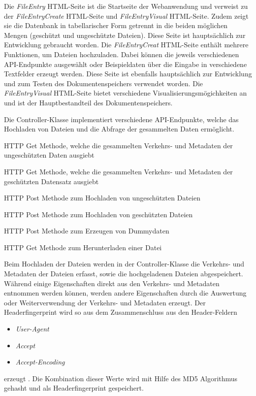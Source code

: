 \documentclass[
    fontsize=12pt,
    headings=small,
    parskip=half,           %
    bibliography=totoc,
    numbers=noenddot,       %
    open=any,               %
    ]{scrreprt}
\begin{document}
Die \textit{FileEntry} HTML-Seite ist die Startseite der Webanwendung und verweist zu der \textit{FileEntryCreate} HTML-Seite und \textit{FileEntryVisual} HTML-Seite.
Zudem zeigt sie die Datenbank in tabellarischer Form getrennt in die beiden möglichen Mengen (geschützt und ungeschützte Dateien).
Diese Seite ist hauptsächlich zur Entwicklung gebraucht worden.
Die \textit{FileEntryCreat} HTML-Seite enthält mehrere Funktionen, um Dateien hochzuladen.
Dabei können die jeweils verschiedenen API-Endpunkte ausgewählt oder Beispieldaten über die Eingabe in verschiedene Textfelder erzeugt werden. 
Diese Seite ist ebenfalls hauptsächlich zur Entwicklung und zum Testen des Dokumentenspeichers verwendet worden.
Die \textit{FileEntryVisual} HTML-Seite bietet verschiedene Visualisierungsmögichkeiten an und ist der Hauptbestandteil des Dokumentenspeichers.

Die Controller-Klasse implementiert verschiedene API-Endpunkte, welche das Hochladen von Dateien und die Abfrage der gesammelten Daten ermöglicht.
\begin{description}[style=nextline]   
\item[/api/GetA] HTTP Get Methode, welche die gesammelten Verkehrs- und Metadaten der ungeschützten Daten ausgiebt
\item[/api/GetB] HTTP Get Methode, welche die gesammelten Verkehrs- und Metadaten der geschützten Datensatz ausgiebt
\item[/api/uploadA] HTTP Post Methode zum Hochladen von ungeschützten Dateien
\item[/api/uploadB] HTTP Post Methode zum Hochladen von geschützten Dateien
\item[api/uploadEmu] HTTP Post Methode zum Erzeugen von Dummydaten
\item[api/getFile] HTTP Get Methode zum Herunterladen einer Datei
\end{description}

Beim Hochladen der Dateien werden in der Controller-Klasse die Verkehrs- und Metadaten der Dateien erfasst, sowie die hochgeladenen Dateien abgespeichert.
Während einige Eigenschaften direkt aus den Verkehrs- und Metadaten entnommen werden können, werden andere Eigenschaften durch die Auswertung oder Weiterverwendung der Verkehrs- und Metadaten erzeugt.
Der Headerfingerprint wird so aus dem Zusammenschluss aus den Header-Feldern
\begin{itemize}
\item \textit{User-Agent} \cite[sec. 5.5.3]{RFC7231}
\item \textit{Accept} \cite[sec. 5.3.2]{RFC7231}
\item \textit{Accept-Encoding} \cite[sec. 5.3.4]{RFC7231}
\end{itemize}
erzeugt \cite[p. 4-5]{Grah10}.
Die Kombination dieser Werte wird mit Hilfe des MD5 \cite{RFC1321} Algorithmus gehasht und als Headerfingerprint gespeichert.
\end{document}
